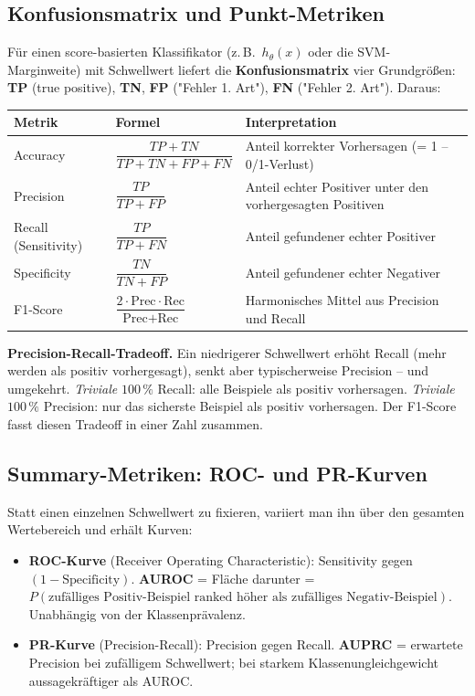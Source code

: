 \documentclass[11pt]{article}
\theoremstyle{csthm}
\theoremstyle{csdef}
\begin{document}
\subsection{Konfusionsmatrix und Punkt-Metriken}

Für einen score-basierten Klassifikator (z.\,B.\ $h_\theta(x)$ oder die SVM-
Marginweite) mit Schwellwert liefert die \textbf{Konfusionsmatrix} vier
Grundgrößen: \textbf{TP} (true positive), \textbf{TN}, \textbf{FP}
("Fehler 1. Art"), \textbf{FN} ("Fehler 2. Art"). Daraus:

\begin{center}
\begin{tabular}{lll}
\toprule
Metrik & Formel & Interpretation \\
\midrule
Accuracy & $\dfrac{TP+TN}{TP+TN+FP+FN}$ & Anteil korrekter Vorhersagen (= 1 -- 0/1-Verlust) \\
Precision & $\dfrac{TP}{TP+FP}$ & Anteil echter Positiver unter den vorhergesagten Positiven \\
Recall (Sensitivity) & $\dfrac{TP}{TP+FN}$ & Anteil gefundener echter Positiver \\
Specificity & $\dfrac{TN}{TN+FP}$ & Anteil gefundener echter Negativer \\
F1-Score & $\dfrac{2\cdot\text{Prec}\cdot\text{Rec}}{\text{Prec}+\text{Rec}}$ & Harmonisches Mittel aus Precision und Recall \\
\bottomrule
\end{tabular}
\end{center}

\begin{tcolorbox}[defstyle]
\textbf{Precision-Recall-Tradeoff.} Ein niedrigerer Schwellwert erhöht
Recall (mehr werden als positiv vorhergesagt), senkt aber typischerweise
Precision -- und umgekehrt. \emph{Triviale} $100\,\%$ Recall: alle Beispiele
als positiv vorhersagen. \emph{Triviale} $100\,\%$ Precision: nur das
sicherste Beispiel als positiv vorhersagen. Der F1-Score fasst diesen
Tradeoff in einer Zahl zusammen.
\end{tcolorbox}

\subsection{Summary-Metriken: ROC- und PR-Kurven}

Statt einen einzelnen Schwellwert zu fixieren, variiert man ihn über den
gesamten Wertebereich und erhält Kurven:

\begin{itemize}
  \item \textbf{ROC-Kurve} (Receiver Operating Characteristic): Sensitivity
        gegen $(1-\text{Specificity})$. \textbf{AUROC} = Fläche darunter =
        $P(\text{zufälliges Positiv-Beispiel ranked höher als zufälliges
        Negativ-Beispiel})$. Unabhängig von der Klassenprävalenz.
  \item \textbf{PR-Kurve} (Precision-Recall): Precision gegen Recall.
        \textbf{AUPRC} = erwartete Precision bei zufälligem Schwellwert;
        bei starkem Klassenungleichgewicht aussagekräftiger als AUROC.
\end{itemize}
\end{document}
